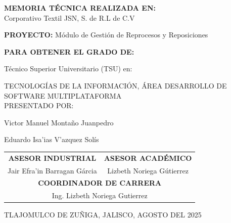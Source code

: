 \documentclass[12pt,letterpaper,spanish]{report}
\begin{document}
\begin{center}

\large{\textbf{MEMORIA TÉCNICA REALIZADA EN:}}
 \\  Corporativo Textil JSN, S. de R.L de C.V

\centerline{\hbox{}}

\large{\textbf{PROYECTO:} Módulo de Gestión de Reprocesos y Reposiciones}

\vspace{0.1in}
\large{\textbf{PARA OBTENER EL GRADO DE:}}

\large{Técnico Superior Universitario (TSU) en:}
\vspace{0.05in}

\large{TECNOLOGÍAS DE LA INFORMACIÓN, ÁREA DESARROLLO DE SOFTWARE MULTIPLATAFORMA }
\\
\large{PRESENTADO POR:}


Victor Manuel Montaño Juanpedro %


Eduardo Isa'ias V'azquez Solís %

\vspace{0.2in}

\begin{tabular}{cc}
    \vspace{0.2in}
    \textbf{ASESOR INDUSTRIAL} & \textbf{ASESOR ACADÉMICO} \\

    Jair Efra'in Barragan Gárcia & Lizbeth Noriega Gútierrez \\
    \multicolumn{2}{c}{\textbf{COORDINADOR DE CARRERA}
    \vspace{0.2in}
    } \\

    \multicolumn{2}{c}{
            Ing. Lizbeth Noriega Gutierrez }
    \end{tabular}

\end{center}
\begin{flushright}\small{ TLAJOMULCO DE ZUÑIGA, JALISCO, AGOSTO DEL 2025} \end{flushright}

\newpage


\end{document}
